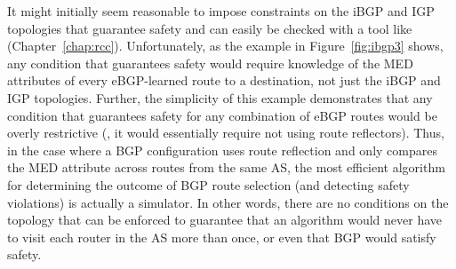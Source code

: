 It might initially seem reasonable to impose constraints on the iBGP and
IGP topologies that guarantee safety and can easily be checked with a
tool like \rcc (Chapter~\ref{chap:rcc}).  Unfortunately, as the
example in Figure~\ref{fig:ibgp3}
shows, any condition that guarantees safety would require knowledge of
the MED attributes of every eBGP-learned route to a destination, not
just the iBGP and IGP topologies.  Further, the simplicity of this
example demonstrates that any condition that guarantees safety for any
combination of eBGP routes would be overly restrictive (\ie, it would
essentially require not using route reflectors).  Thus, in the case
where a BGP configuration uses route reflection and only compares the
MED attribute across routes from the same AS, the most efficient
algorithm for determining the outcome of BGP route selection (and
detecting safety violations) is actually a simulator.  In other words,
there are no conditions on the topology that can be enforced to
guarantee that an algorithm would never have to visit each router in the
AS more than once, or even that BGP would satisfy safety.
